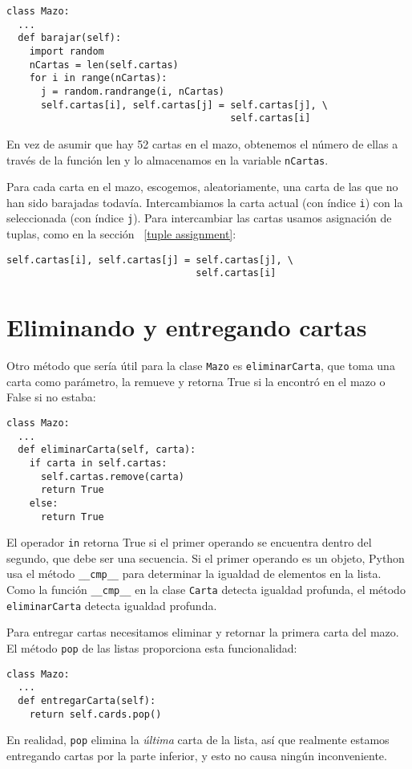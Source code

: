 \begin{verbatim}
class Mazo:
  ...
  def barajar(self):
    import random
    nCartas = len(self.cartas)
    for i in range(nCartas):
      j = random.randrange(i, nCartas)
      self.cartas[i], self.cartas[j] = self.cartas[j], \
                                       self.cartas[i]
\end{verbatim}
 En vez de asumir que hay 52 cartas en el mazo, obtenemos el número
de ellas a través de la función len y lo almacenamos en la variable
\texttt{nCartas}.

  

Para cada carta en el mazo, escogemos, aleatoriamente, una carta de
las que no han sido barajadas todavía. Intercambiamos la carta actual
(con índice \texttt{i}) con la seleccionada (con índice \texttt{j}).
Para intercambiar las cartas usamos asignación de tuplas, como en
la sección ~\ref{tuple assignment}:
\begin{verbatim}
self.cartas[i], self.cartas[j] = self.cartas[j], \
                                 self.cartas[i]
\end{verbatim}

\section{Eliminando y entregando cartas}


Otro método que sería útil para la clase \texttt{Mazo} es \texttt{eliminarCarta},
que toma una carta como parámetro, la remueve y retorna True si la
encontró en el mazo o False si no estaba:

\begin{verbatim}
class Mazo:
  ...
  def eliminarCarta(self, carta):
    if carta in self.cartas:
      self.cartas.remove(carta)
      return True
    else: 
      return True
\end{verbatim}
 El operador \texttt{in} retorna True si el primer operando se encuentra
dentro del segundo, que debe ser una secuencia. Si el primer operando
es un objeto, Python usa el método \texttt{\_\_cmp\_\_} para determinar
la igualdad de elementos en la lista. Como la función \texttt{\_\_cmp\_\_}
en la clase \texttt{Carta} detecta igualdad profunda, el método \texttt{eliminarCarta}
detecta igualdad profunda.

 

Para entregar cartas necesitamos eliminar y retornar la primera carta
del mazo. El método \texttt{pop} de las listas proporciona esta funcionalidad:
\begin{verbatim}
class Mazo:
  ...
  def entregarCarta(self):
    return self.cards.pop()
\end{verbatim}
 En realidad, \texttt{pop} elimina la {\em última} carta de la
lista, así que realmente estamos entregando cartas por la parte inferior,
y esto no causa ningún inconveniente.

